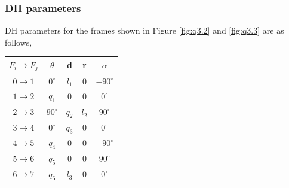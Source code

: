 \documentclass[12pt]{article}
\begin{document}
\subsubsection*{DH parameters}
DH parameters for the frames shown in Figure \ref{fig:q3.2} and \ref{fig:q3.3} are as follows,
\begin{center}
\begin{tabular}{ c | c c c c }
 \hline
 $F_i \to F_j$ & $\theta$ & d & r & $\alpha$ \\
 \hline
 $0 \to 1$ & $0^{\circ}$    & $l_1$                      & $0$     &   $-90^{\circ}$    \\
 $1 \to 2$ & $q_1$          & $0$                        & $0$     &   $0^{\circ}$      \\
 $2 \to 3$ & $90^{\circ}$   & $q_2$                      & $l_2$   &   $90^{\circ}$     \\
 $3 \to 4$ & $0^{\circ}$    & $q_3$                      & $0$     &   $0^{\circ}$      \\
 $4 \to 5$ & $q_4$          & $0$                        & $0$     &   $-90^{\circ}$    \\
 $5 \to 6$ & $q_5$          & $0$                        & $0$     &   $90^{\circ}$     \\
 $6 \to 7$ & $q_6$          & $l_3$                      & $0$     &   $0^{\circ}$      \\
 \hline
\end{tabular}
\end{center}
\end{document}
